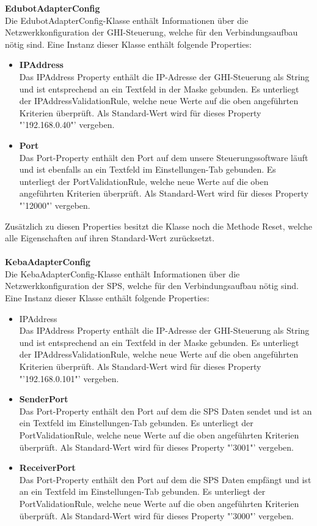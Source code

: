 \textbf{EdubotAdapterConfig}\\
Die EdubotAdapterConfig-Klasse enthält Informationen über die Netzwerkkonfiguration der GHI-Steuerung, welche für den Verbindungsaufbau nötig sind.
Eine Instanz dieser Klasse enthält folgende Properties:
\begin{itemize}
\item \textbf{IPAddress}\\
Das IPAddress Property enthält die IP-Adresse der GHI-Steuerung als String und ist entsprechend an ein Textfeld in der Maske gebunden. Es unterliegt der IPAddressValidationRule, welche neue Werte auf die oben angeführten Kriterien überprüft. Als Standard-Wert wird für dieses Property "'192.168.0.40"' vergeben.
\item \textbf{Port}\\
Das Port-Property enthält den Port auf dem unsere Steuerungssoftware läuft und ist ebenfalls an ein Textfeld im Einstellungen-Tab gebunden. Es unterliegt der PortValidationRule,  welche neue Werte auf die oben angeführten Kriterien überprüft. Als Standard-Wert wird für dieses Property "'12000"' vergeben.
\end{itemize}
Zusätzlich zu diesen Properties besitzt die Klasse noch die Methode Reset, welche alle Eigenschaften auf ihren Standard-Wert zurücksetzt.\\
\\
\textbf{KebaAdapterConfig}\\
Die KebaAdapterConfig-Klasse enthält Informationen über die Netzwerkkonfiguration der SPS, welche für den Verbindungsaufbau nötig sind.
Eine Instanz dieser Klasse enthält folgende Properties:
\begin{itemize}
\item IPAddress\\
Das IPAddress Property enthält die IP-Adresse der GHI-Steuerung als String und ist entsprechend an ein Textfeld in der Maske gebunden. Es unterliegt der IPAddressValidationRule, welche neue Werte auf die oben angeführten Kriterien überprüft. Als Standard-Wert wird für dieses Property "'192.168.0.101"' vergeben.
\item \textbf{SenderPort}\\
Das Port-Property enthält den Port auf dem die SPS Daten sendet und ist an ein Textfeld im Einstellungen-Tab gebunden. Es unterliegt der PortValidationRule,  welche neue Werte auf die oben angeführten Kriterien überprüft. Als Standard-Wert wird für dieses Property "'3001"' vergeben.
\item \textbf{ReceiverPort}\\
Das Port-Property enthält den Port auf dem die SPS Daten empfängt  und ist an ein Textfeld im Einstellungen-Tab gebunden. Es unterliegt der PortValidationRule,  welche neue Werte auf die oben angeführten Kriterien überprüft. Als Standard-Wert wird für dieses Property "'3000"' vergeben.
\end{itemize}
